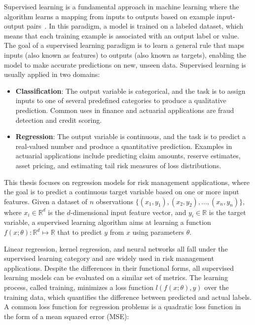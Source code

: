 Supervised learning is a fundamental approach in machine learning where the algorithm learns a mapping from inputs to outputs based on example input-output pairs~\cite{galton1886regression}.
In this paradigm, a model is trained on a labeled dataset, which means that each training example is associated with an output label or value.
The goal of a supervised learning paradigm is to learn a general rule that maps inputs (also known as features) to outputs (also known as targets), enabling the model to make accurate predictions on new, unseen data.
Supervised learning is usually applied in two domains:
\begin{itemize} 
    \item \textbf{Classification}: The output variable is categorical, and the task is to assign inputs to one of several predefined categories to produce a qualitative prediction.
    Common uses in finance and actuarial applications are fraud detection and credit scoring.
    \item \textbf{Regression}: The output variable is continuous, and the task is to predict a real-valued number and produce a quantitative prediction.
    Examples in actuarial applications include predicting claim amounts, reserve estimates, asset pricing, and estimating tail risk measures of loss distributions.
\end{itemize}

This thesis focuses on regression models for risk management applications, where the goal is to predict a continuous target variable based on one or more input features.
Given a dataset of $n$ observations $\{(x_1, y_1), (x_2, y_2), \ldots, (x_n, y_n)\}$, where $x_i \in \mathbb{R}^d$ is the $d$-dimensional input feature vector, and $y_i \in \mathbb{R}$ is the target variable, a supervised learning algorithm aims at learning a function $f(x;\theta): \mathbb{R}^d \mapsto \mathbb{R}$ that to predict $y$ from $x$ using parameters $\theta$.

Linear regression, kernel regression, and neural networks all fall under the supervised learning category and are widely used in risk management applications.
Despite the differences in their functional forms, all supervised learning models can be evaluated on a similar set of metrics.
The learning process, called training, minimizes a loss function $l(f(x; \theta),y)$ over the training data, which quantifies the difference between predicted and actual labels.
A common loss function for regression problems is a quadratic loss function in the form of a mean squared error (MSE):

